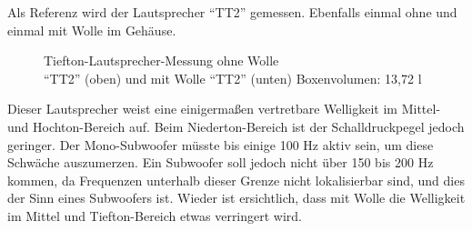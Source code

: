 \newpage
Als Referenz wird der Lautsprecher \enquote{TT2} gemessen. 
Ebenfalls einmal ohne und einmal mit Wolle im Gehäuse.
\begin{figure} [H]
	\centering
	\quad
	\caption{Tiefton-Lautsprecher-Messung ohne Wolle\\ \enquote{TT2} (oben) und mit Wolle \enquote{TT2} (unten) Boxenvolumen: 13,72 l}
	\label{fig:4.2.4.2}
\end{figure}
Dieser Lautsprecher weist eine einigermaßen vertretbare Welligkeit im Mittel- und Hochton-Bereich auf.
Beim Niederton-Bereich ist der Schalldruckpegel jedoch geringer.
Der Mono-Subwoofer müsste bis einige 100 Hz aktiv sein, um diese Schwäche auszumerzen.
Ein Subwoofer soll jedoch nicht über 150 bis 200 Hz kommen, da Frequenzen unterhalb dieser Grenze nicht lokalisierbar sind, und dies der Sinn eines Subwoofers ist.
Wieder ist ersichtlich, dass mit Wolle die Welligkeit im Mittel und Tiefton-Bereich etwas verringert wird.

